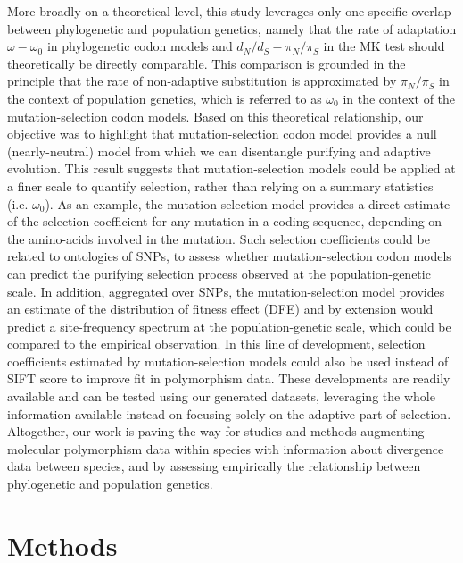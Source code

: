 \documentclass{article}
\newcommand{\dn}{d_N}
\newcommand{\ds}{d_S}
\newcommand{\dnds}{\dn / \ds}
\newcommand{\pn}{\pi_N}
\newcommand{\ps}{\pi_S}
\newcommand{\pnps}{\pn / \ps}
\begin{document}
    More broadly on a theoretical level, this study leverages only one specific overlap between phylogenetic and population genetics, namely that the rate of adaptation $\omega - \omega_{0}$ in phylogenetic codon models and $\dnds - \pnps$ in the MK test should theoretically be directly comparable.
    This comparison is grounded in the principle that the rate of non-adaptive substitution is approximated by $\pnps$ in the context of population genetics, which is referred to as $\omega_{0}$ in the context of the mutation-selection codon models.
    Based on this theoretical relationship, our objective was to highlight that mutation-selection codon model provides a null (nearly-neutral) model from which we can disentangle purifying and adaptive evolution.
    This result suggests that mutation-selection models could be applied at a finer scale to quantify selection, rather than relying on a summary statistics (i.e. $\omega_{0}$).
    As an example, the mutation-selection model provides a direct estimate of the selection coefficient for any mutation in a coding sequence, depending on the amino-acids involved in the mutation.
    Such selection coefficients could be related to ontologies of SNPs, to assess whether mutation-selection codon models can predict the purifying selection process observed at the population-genetic scale.
    In addition, aggregated over SNPs, the mutation-selection model provides an estimate of the distribution of fitness effect (DFE) and by extension would predict a site-frequency spectrum at the population-genetic scale, which could be compared to the empirical observation.
    In this line of development, selection coefficients estimated by mutation-selection models could also be used instead of SIFT score to improve fit in polymorphism data\cite{chen_hunting_2021}.
    These developments are readily available and can be tested using our generated datasets, leveraging the whole information available instead on focusing solely on the adaptive part of selection.
    Altogether, our work is paving the way for studies and methods augmenting molecular polymorphism data within species with information about divergence data between species, and by assessing empirically the relationship between phylogenetic and population genetics\cite{thorne_codon_2012}.

    \section*{Methods}\label{sec:methods}
\end{document}
